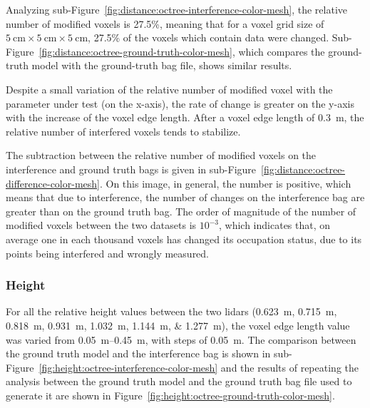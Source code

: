 Analyzing sub-Figure~\ref{fig:distance:octree-interference-color-mesh}, the relative number of modified voxels is 27.5\%, meaning that for a voxel grid size of $\SI{5}{\centi\meter}\times \SI{5}{\centi\meter}\times \SI{5}{\centi\meter}$, 27.5\% of the voxels which contain data were changed. Sub-Figure~\ref{fig:distance:octree-ground-truth-color-mesh}, which compares the ground-truth model with the ground-truth bag file, shows similar results.  

Despite a small variation of the relative number of modified voxel with the parameter under test (on the x-axis), the rate of change is greater on the y-axis with the increase of the voxel edge length. After a voxel edge length of \SI{0.3}{\meter}, the relative number of interfered voxels tends to stabilize. 

The subtraction between the relative number of modified voxels on the interference and ground truth bags is given in sub-Figure~\ref{fig:distance:octree-difference-color-mesh}. On this image, in general, the number is positive, which means that due to interference, the number of changes on the interference bag are greater than on the ground truth bag. The order of magnitude of the number of modified voxels between the two datasets is $10^{-3}$, which indicates that, on average one in each thousand voxels has changed its occupation status, due to its points being interfered and wrongly measured.


\subsubsection{Height}
For all the relative height values between the two \acp{lidar} (\SIlist[list-units=single]{0.623; 0.715; 0.818; 0.931; 1.032; 1.144; 1.277}{\meter}), the voxel edge length value was varied from \SIrange{0.05}{0.45}{\meter}, with steps of \SI{0.05}{\meter}. The comparison between the ground truth model and the interference bag is shown in sub-Figure~\ref{fig:height:octree-interference-color-mesh} and the results of repeating the analysis between the ground truth model and the ground truth bag file used to generate it are shown in Figure~\ref{fig:height:octree-ground-truth-color-mesh}.

